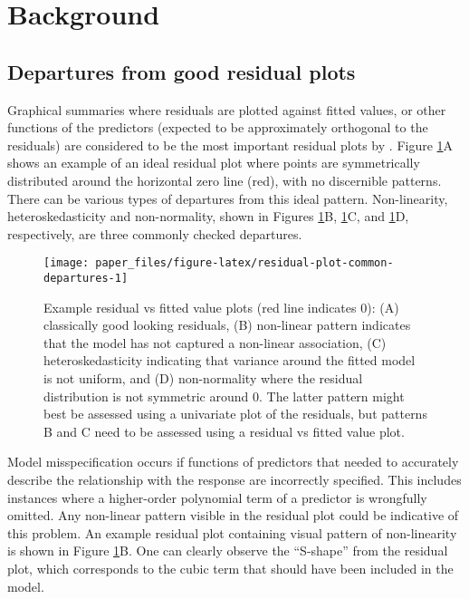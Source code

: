 \documentclass[]{interact}
\theoremstyle{plain}%
\theoremstyle{definition}
\theoremstyle{remark}
\begin{document}
\hypertarget{background}{%
\section{Background}\label{background}}

\hypertarget{departures-from-good-residual-plots}{%
\subsection{Departures from good residual
plots}\label{departures-from-good-residual-plots}}

Graphical summaries where residuals are plotted against fitted values,
or other functions of the predictors (expected to be approximately
orthogonal to the residuals) are considered to be the most important
residual plots by \citet{cook1999applied}. Figure
\ref{fig:residual-plot-common-departures}A shows an example of an ideal
residual plot where points are symmetrically distributed around the
horizontal zero line (red), with no discernible patterns. There can be
various types of departures from this ideal pattern. Non-linearity,
heteroskedasticity and non-normality, shown in Figures
\ref{fig:residual-plot-common-departures}B,
\ref{fig:residual-plot-common-departures}C, and
\ref{fig:residual-plot-common-departures}D, respectively, are three
commonly checked departures.

\begin{figure}[t!]

{\centering \texttt{[image: paper\_files/figure-latex/residual-plot-common-departures-1]} 

}

\caption{Example residual vs fitted value plots (red line indicates 0): (A) classically good looking residuals, (B) non-linear pattern indicates that the model has not captured a non-linear association, (C) heteroskedasticity indicating that variance around the fitted model is not uniform, and (D) non-normality where the residual distribution is not symmetric around 0. The latter pattern might best be assessed using a univariate plot of the residuals, but patterns B and C need to be assessed using a residual vs fitted value plot.}\label{fig:residual-plot-common-departures}
\end{figure}

Model misspecification occurs if functions of predictors that needed to
accurately describe the relationship with the response are incorrectly
specified. This includes instances where a higher-order polynomial term
of a predictor is wrongfully omitted. Any non-linear pattern visible in
the residual plot could be indicative of this problem. An example
residual plot containing visual pattern of non-linearity is shown in
Figure \ref{fig:residual-plot-common-departures}B. One can clearly
observe the ``S-shape'' from the residual plot, which corresponds to the
cubic term that should have been included in the model.
\end{document}

